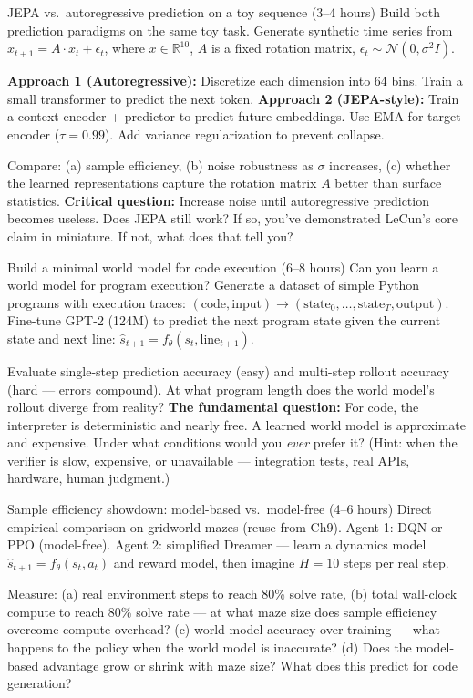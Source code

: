 \begin{exercise}{JEPA vs.\ autoregressive prediction on a toy sequence (3--4 hours)}
Build both prediction paradigms on the same toy task. Generate synthetic time series from $x_{t+1} = A \cdot x_t + \epsilon_t$, where $x \in \mathbb{R}^{10}$, $A$ is a fixed rotation matrix, $\epsilon_t \sim \mathcal{N}(0, \sigma^2 I)$.

\textbf{Approach 1 (Autoregressive):} Discretize each dimension into 64 bins. Train a small transformer to predict the next token. \textbf{Approach 2 (JEPA-style):} Train a context encoder + predictor to predict future embeddings. Use EMA for target encoder ($\tau = 0.99$). Add variance regularization to prevent collapse.

Compare: (a) sample efficiency, (b) noise robustness as $\sigma$ increases, (c) whether the learned representations capture the rotation matrix $A$ better than surface statistics. \textbf{Critical question:} Increase noise until autoregressive prediction becomes useless. Does JEPA still work? If so, you've demonstrated LeCun's core claim in miniature. If not, what does that tell you?
\end{exercise}

\begin{exercise}{Build a minimal world model for code execution (6--8 hours)}
Can you learn a world model for program execution? Generate a dataset of simple Python programs with execution traces: $(\text{code}, \text{input}) \to (\text{state}_0, \ldots, \text{state}_T, \text{output})$. Fine-tune GPT-2 (124M) to predict the next program state given the current state and next line: $\hat{s}_{t+1} = f_\theta(s_t, \text{line}_{t+1})$.

Evaluate single-step prediction accuracy (easy) and multi-step rollout accuracy (hard --- errors compound). At what program length does the world model's rollout diverge from reality? \textbf{The fundamental question:} For code, the interpreter is deterministic and nearly free. A learned world model is approximate and expensive. Under what conditions would you \textit{ever} prefer it? (Hint: when the verifier is slow, expensive, or unavailable --- integration tests, real APIs, hardware, human judgment.)
\end{exercise}

\begin{exercise}{Sample efficiency showdown: model-based vs.\ model-free (4--6 hours)}
Direct empirical comparison on gridworld mazes (reuse from Ch9). Agent 1: DQN or PPO (model-free). Agent 2: simplified Dreamer --- learn a dynamics model $\hat{s}_{t+1} = f_\theta(s_t, a_t)$ and reward model, then imagine $H = 10$ steps per real step.

Measure: (a) real environment steps to reach 80\% solve rate, (b) total wall-clock compute to reach 80\% solve rate --- at what maze size does sample efficiency overcome compute overhead? (c) world model accuracy over training --- what happens to the policy when the world model is inaccurate? (d) Does the model-based advantage grow or shrink with maze size? What does this predict for code generation?
\end{exercise}

